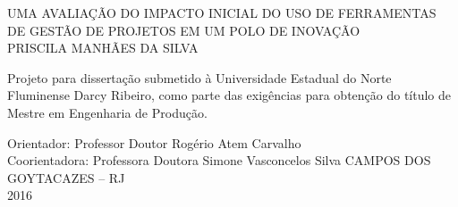 \begin{titlepage}
 \begin{center}
   {\large UMA AVALIAÇÃO DO IMPACTO INICIAL DO USO DE FERRAMENTAS DE GESTÃO DE PROJETOS EM UM POLO DE INOVAÇÃO} \\ [5cm]
   {\large PRISCILA MANHÃES DA SILVA} \\ [1.5cm]
   \hspace{.45\textwidth} %
   \begin{minipage}{0.5\textwidth}
   \begin{espacosimples}
        Projeto para dissertação submetido à Universidade Estadual do Norte Fluminense Darcy Ribeiro, como parte das exigências para obtenção do título de Mestre em Engenharia de Produção. \\[5cm]
    \end{espacosimples}
    \end{minipage}
    {\normalsize Orientador: Professor Doutor Rogério Atem Carvalho}\\
    {\normalsize Coorientadora: Professora Doutora Simone Vasconcelos Silva}
   \vfill
   {\large CAMPOS DOS GOYTACAZES – RJ} \\
   {\large 2016}
 \end{center}
\end{titlepage}

